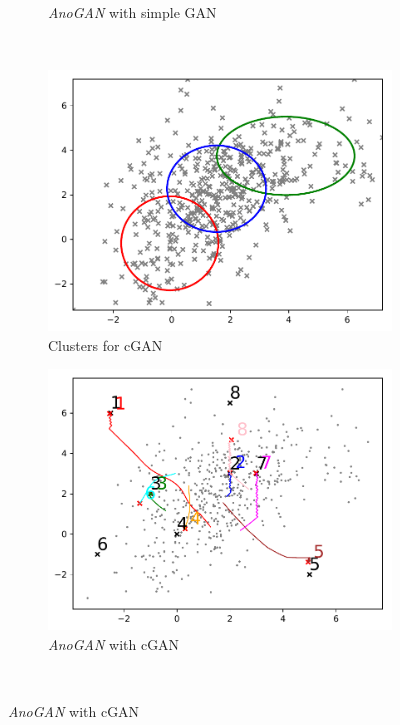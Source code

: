 \documentclass{article} %
\begin{document}
\begin{figure}[h]
\begin{subfigure}[b]{0.45\textwidth}
		\caption{{\em AnoGAN} with simple GAN}
		\label{fig:gan_ano}
	\end{subfigure} \\
	\begin{subfigure}[b]{0.45\textwidth}
		\includegraphics[width=\textwidth]{toy2_cond_ano_gan_k3_ls9_2000.pdf}
		\caption{Clusters for cGAN}
		\label{fig:cgan_k}
	\end{subfigure}
	\begin{subfigure}[b]{0.45\textwidth}
		\includegraphics[width=\textwidth]{toy2_cond_ano_gan_k3_ls9_2000_test_ano_50.pdf}
		\caption{{\em AnoGAN} with cGAN}
		\label{fig:cgan_ano}
	\end{subfigure} \\[-1ex]

\end{figure}
\end{document}

